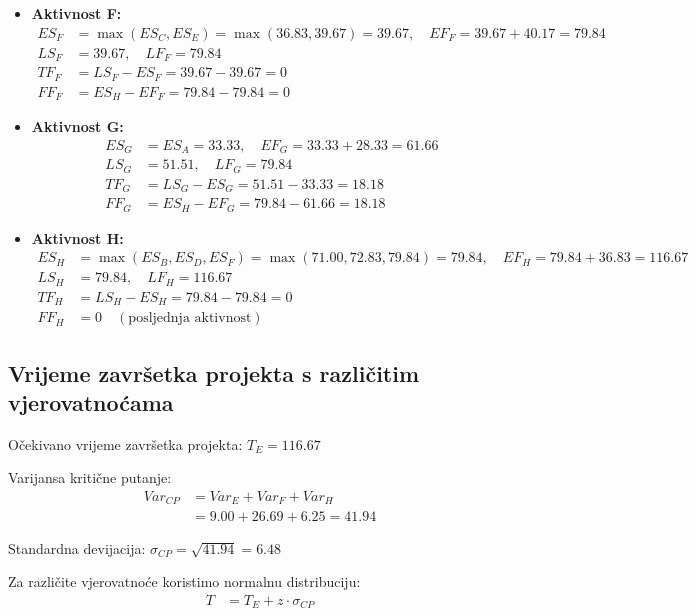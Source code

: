 \documentclass[12pt,a4paper]{article}
\begin{document}
\begin{itemize}
\item \textbf{Aktivnost F:}
  \begin{align}
  ES_F &= \max(ES_C, ES_E) = \max(36.83, 39.67) = 39.67, \quad EF_F = 39.67 + 40.17 = 79.84 \\
  LS_F &= 39.67, \quad LF_F = 79.84 \\
  TF_F &= LS_F - ES_F = 39.67 - 39.67 = 0 \\
  FF_F &= ES_H - EF_F = 79.84 - 79.84 = 0
  \end{align}

\item \textbf{Aktivnost G:}
  \begin{align}
  ES_G &= ES_A = 33.33, \quad EF_G = 33.33 + 28.33 = 61.66 \\
  LS_G &= 51.51, \quad LF_G = 79.84 \\
  TF_G &= LS_G - ES_G = 51.51 - 33.33 = 18.18 \\
  FF_G &= ES_H - EF_G = 79.84 - 61.66 = 18.18
  \end{align}

\item \textbf{Aktivnost H:}
  \begin{align}
  ES_H &= \max(ES_B, ES_D, ES_F) = \max(71.00, 72.83, 79.84) = 79.84, \quad EF_H = 79.84 + 36.83 = 116.67 \\
  LS_H &= 79.84, \quad LF_H = 116.67 \\
  TF_H &= LS_H - ES_H = 79.84 - 79.84 = 0 \\
  FF_H &= 0 \quad (\text{posljednja aktivnost})
  \end{align}
\end{itemize}

\subsection{Vrijeme završetka projekta s različitim vjerovatnoćama}

Očekivano vrijeme završetka projekta: $T_E = 116.67$

Varijansa kritične putanje:
\begin{align}
Var_{CP} &= Var_E + Var_F + Var_H \\
&= 9.00 + 26.69 + 6.25 = 41.94
\end{align}

Standardna devijacija: $\sigma_{CP} = \sqrt{41.94} = 6.48$

Za različite vjerovatnoće koristimo normalnu distribuciju:
\begin{align}
T &= T_E + z \cdot \sigma_{CP}
\end{align}
\end{document}
